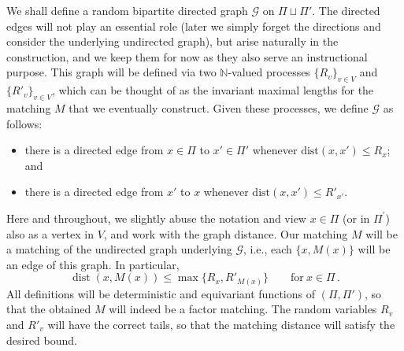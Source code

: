 \documentclass[11pt, reqno]{article}
\numberwithin{equation}{section}
\theoremstyle{definition}
\def\cG{\mathcal{G}}
\def\N{\mathbb{N}}
\newcommand{\1}{\mathds{1}}
\DeclareMathOperator{\dist}{dist}
\begin{document}
We shall define a random bipartite directed graph $\cG$ on $\Pi \sqcup \Pi'$.
The directed edges will not play an essential role (later we simply forget the directions and consider the underlying undirected graph), but arise naturally in the construction, and we keep them for now as they also serve an instructional purpose. This graph will be defined via two $\N$-valued processes $\{R_v\}_{v\in V}$ and $\{R'_v\}_{v\in V}$, which can be thought of as the invariant maximal lengths for the matching $M$ that we eventually construct. Given these processes, we define $\cG$ as follows: 
\begin{itemize}
    \item there is a directed edge from $x\in \Pi$ to $x'\in \Pi'$ whenever $\text{dist}(x,x') \le R_x$; and 
    \item there is a directed edge from $x'$ to $x$ whenever $\text{dist}(x,x') \le R'_{x'}$.
\end{itemize}
Here and throughout, we slightly abuse the notation and view $x\in \Pi$ (or in $\Pi^\prime$) also as a vertex in $V$, and work with the graph distance.
Our matching $M$ will be a matching of the undirected graph underlying $\cG$, i.e., each $\{x,M(x)\}$ will be an edge of this graph. In particular, 
\begin{equation}
\label{eq:bound_on_matching_distance_by_r}
\dist(x,M(x)) \le \max\big\{R_x,R'_{M(x)}\big\} \qquad \text{for} \ x\in \Pi \, .    
\end{equation}
All definitions will be deterministic and equivariant functions of $(\Pi,\Pi')$, so that the obtained $M$ will indeed be a factor matching. The random variables $R_v$ and $R'_v$ will have the correct tails, so that the matching distance will satisfy the desired bound.
\end{document}
